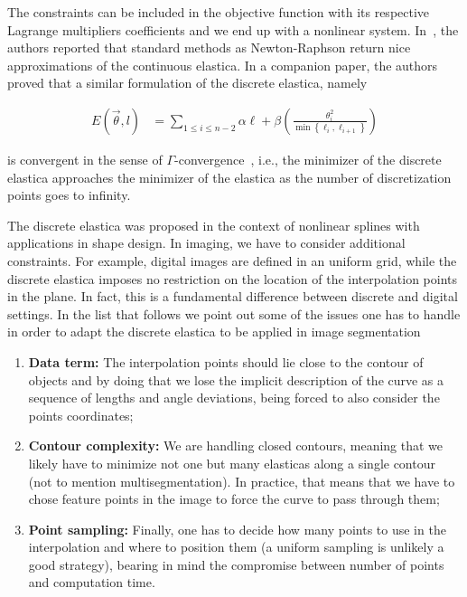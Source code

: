 The constraints can be included in the objective function with its respective Lagrange multipliers coefficients and we end up with a nonlinear system. In~\cite{bruckstein01discrete}, the authors reported that standard methods as Newton-Raphson return nice approximations of the continuous elastica. In a companion paper, the authors proved that a similar formulation of the discrete elastica, namely


\begin{align}
	E(\vec{\theta},l) &= \sum_{1 \leq i \leq n-2}{ \alpha \ell + \beta \left( \frac{\theta_i^2}{\min \left\{{\ell_i,\ell_{i+1}} \right\} }\right)}
	\label{ch4:eq:discrete-elastica}
\end{align}

is convergent in the sense of $\Gamma$-convergence~\cite{bruckstein01epi}, i.e., the minimizer of the discrete elastica approaches the minimizer of the elastica as the number of discretization points goes to infinity. 

The discrete elastica was proposed in the context of nonlinear splines with applications in shape design. In imaging, we have to consider additional constraints. For example,  digital images are defined in an uniform grid, while the discrete elastica imposes no restriction on the location of the interpolation points in the plane. In fact, this is a fundamental difference between discrete and digital settings. In the list that follows we point out some of the issues one has to handle in order to adapt the discrete elastica to be applied in image segmentation

\begin{enumerate}
	\item{\textbf{Data term:} The interpolation points should lie close to the contour of objects and by doing that we lose the implicit description of the curve as a sequence of lengths and angle deviations, being forced to also consider the points coordinates;}
	\item{\textbf{Contour complexity:} We are handling closed contours, meaning that we likely have to minimize not one but many elasticas along a single contour (not to mention multisegmentation). In practice, that means that we have to chose feature points in the image to force the curve to pass through them;}
	\item{\textbf{Point sampling:} Finally, one has to decide how many points to use in the interpolation and where to position them (a uniform sampling is unlikely a good strategy), bearing in mind the compromise between number of points and computation time.}
\end{enumerate}




